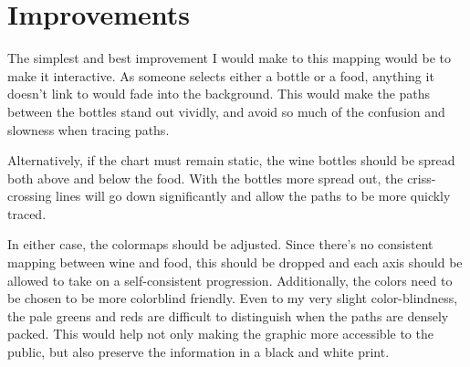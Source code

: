 \documentclass[a4paper,11pt]{article}
\begin{document}
\section{Improvements}
The simplest and best improvement I would make to this mapping would be to make it interactive.  As someone selects either a bottle or a food, anything it doesn't link to would fade into the background.  This would make the paths between the bottles stand out vividly, and avoid so much of the confusion and slowness when tracing paths.

Alternatively, if the chart must remain static, the wine bottles should be spread both above and below the food.  With the bottles more spread out, the criss-crossing lines will go down significantly and allow the paths to be more quickly traced.  

In either case, the colormaps should be adjusted.  Since there's no consistent mapping between wine and food, this should be dropped and each axis should be allowed to take on a self-consistent progression.  Additionally, the colors need to be chosen to be more colorblind friendly.  Even to my very slight color-blindness, the pale greens and reds are difficult to distinguish when the paths are densely packed.  This would help not only making the graphic more accessible to the public, but also preserve the information in a black and white print.

\end{document}
